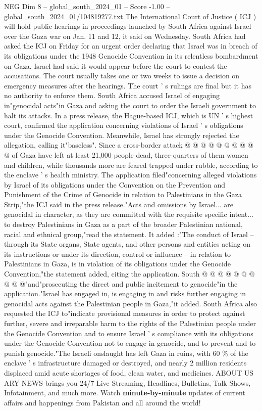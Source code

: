 \begin{textsample}{NEG Dim 8 – global\_south\_2024\_01 – Score -1.00 – global\_south\_2024\_01/104819277.txt}  \label{ex:f8_neg_055}
The International Court of Justice ( ICJ ) will hold public hearings in proceedings launched by South Africa against Israel over the Gaza war on Jan. 11 and 12, it said on Wednesday.
South Africa had asked the ICJ on Friday for an urgent order declaring that Israel was in breach of its obligations under the 1948 Genocide Convention in its relentless bombardment on Gaza.
Israel had said it would appear before the court to contest the accusations.
The court usually takes one or two weeks to issue a decision on emergency measures after the hearings.
The court ' s rulings are final but it has no authority to enforce them.
South Africa accused Israel of engaging in"genocidal acts"in Gaza and asking the court to order the Israeli government to halt its attacks.
In a press release, the Hague-based ICJ, which is UN ' s highest court, confirmed the application concerning violations of Israel ' s obligations under the Genocide Convention.
Meanwhile, Israel has strongly rejected the allegation, calling it"baseless".
Since a cross-border attack @ @ @ @ @ @ @ @ @ @ of Gaza have left at least 21,000 people dead, three-quarters of them women and children, while thousands more are feared trapped under rubble, according to the enclave ' s health ministry.
The application filed"concerning alleged violations by Israel of its obligations under the Convention on the Prevention and Punishment of the Crime of Genocide in relation to Palestinians in the Gaza Strip,"the ICJ said in the press release."Acts and omissions by Israel... are genocidal in character, as they are committed with the requisite specific intent... to destroy Palestinians in Gaza as a part of the broader Palestinian national, racial and ethnical group,"read the statement.
It added :"The conduct of Israel -- through its State organs, State agents, and other persons and entities acting on its instructions or under its direction, control or influence -- in relation to Palestinians in Gaza, is in violation of its obligations under the Genocide Convention,"the statement added, citing the application.
South @ @ @ @ @ @ @ @ @ @"and"prosecuting the direct and public incitement to genocide"in the application."Israel has engaged in, is engaging in and risks further engaging in genocidal acts against the Palestinian people in Gaza,"it added.
South Africa also requested the ICJ to"indicate provisional measures in order to protect against further, severe and irreparable harm to the rights of the Palestinian people under the Genocide Convention and to ensure Israel ' s compliance with its obligations under the Genocide Convention not to engage in genocide, and to prevent and to punish genocide."The Israeli onslaught has left Gaza in ruins, with 60 \% of the enclave ' s infrastructure damaged or destroyed, and nearly 2 million residents displaced amid acute shortages of food, clean water, and medicines.
ABOUT US ARY NEWS brings you 24/7 Live Streaming, Headlines, Bulletins, Talk Shows, Infotainment, and much more.
Watch \textbf{minute-by-minute} updates of current affairs and happenings from Pakistan and all around the world!

\end{textsample}
